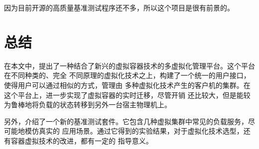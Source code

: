因为目前开源的高质量基准测试程序还不多，所以这个项目是很有前景的。

\section{总结}

在本文中，提出了一种结合了新兴的虚拟容器技术的多虚拟化管理平台。这个平台在不同种类的、完全
不同原理的虚拟化技术之上，构建了一个统一的用户接口，使得用户可以通过相似的方式，管理由
多种虚拟化技术产生的客户机的集群。在这个平台上，进一步实现了虚拟容器的实时迁移，尽管开销
还比较大，但是能较为鲁棒地将负载的状态转移到另外一台宿主物理机上。

另外，介绍了一个新的基准测试套件。它包含几种虚拟集群中常见的负载服务，尽可能地模仿真实的
应用场景。通过它得到的实验结果，对于虚拟化技术选型，还有容器虚拟技术的改进，都有一定的
指导意义。
